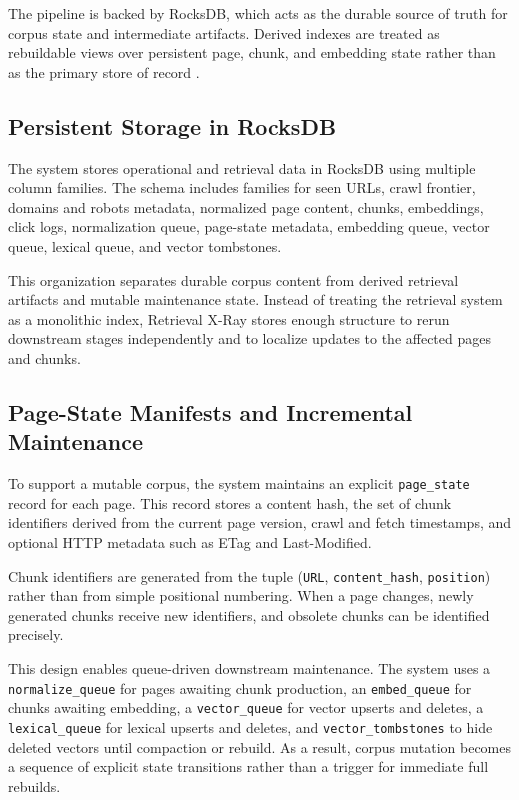 \documentclass[conference]{IEEEtran}
\newcommand{\system}{Retrieval X-Ray\xspace}
\begin{document}
The pipeline is backed by RocksDB, which acts as the durable source of truth for corpus state and intermediate artifacts. Derived indexes are treated as rebuildable views over persistent page, chunk, and embedding state rather than as the primary store of record \cite{cao2020rocksdb}.

\subsection{Persistent Storage in RocksDB}
The system stores operational and retrieval data in RocksDB using multiple column families. The schema includes families for seen URLs, crawl frontier, domains and robots metadata, normalized page content, chunks, embeddings, click logs, normalization queue, page-state metadata, embedding queue, vector queue, lexical queue, and vector tombstones.

This organization separates durable corpus content from derived retrieval artifacts and mutable maintenance state. Instead of treating the retrieval system as a monolithic index, \system stores enough structure to rerun downstream stages independently and to localize updates to the affected pages and chunks.

\subsection{Page-State Manifests and Incremental Maintenance}
To support a mutable corpus, the system maintains an explicit \texttt{page\_state} record for each page. This record stores a content hash, the set of chunk identifiers derived from the current page version, crawl and fetch timestamps, and optional HTTP metadata such as ETag and Last-Modified.

Chunk identifiers are generated from the tuple (\texttt{URL}, \texttt{content\_hash}, \texttt{position}) rather than from simple positional numbering. When a page changes, newly generated chunks receive new identifiers, and obsolete chunks can be identified precisely.

This design enables queue-driven downstream maintenance. The system uses a \texttt{normalize\_queue} for pages awaiting chunk production, an \texttt{embed\_queue} for chunks awaiting embedding, a \texttt{vector\_queue} for vector upserts and deletes, a \texttt{lexical\_queue} for lexical upserts and deletes, and \texttt{vector\_tombstones} to hide deleted vectors until compaction or rebuild. As a result, corpus mutation becomes a sequence of explicit state transitions rather than a trigger for immediate full rebuilds.
\end{document}
